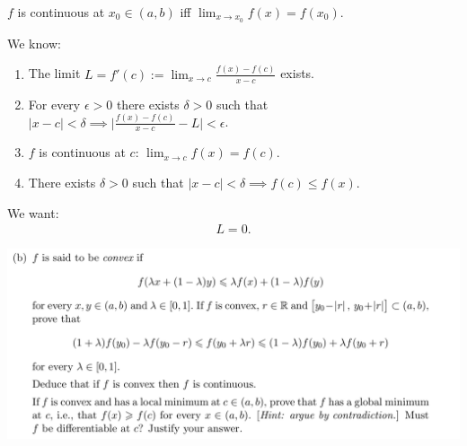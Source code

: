\documentclass[12pt]{article}
\begin{document}
$f$ is continuous at $x_0 \in (a, b)$ iff $\lim_{x\to x_0} f(x) = f(x_0)$.

We know:

\begin{enumerate}
\item The limit $L = f'(c) := \lim_{x\to c} \frac{f(x) - f(c)}{x - c}$ exists.
\item For every $\epsilon > 0$ there exists $\delta > 0$ such that
  $|x - c| < \delta \implies \Big|\frac{f(x) - f(c)}{x - c} - L\Big| < \epsilon$.
\item $f$ is continuous at $c$: $\lim_{x\to c}f(x) = f(c)$.
\item There exists $\delta > 0$ such that $|x - c| < \delta \implies f(c) \leq f(x)$.
\end{enumerate}

We want:
\begin{align*}
  L = 0.
\end{align*}


\newpage

\begin{mdframed}
\includegraphics[width=400pt]{img/misc--cambridge-1a-10D-b.png}
\end{mdframed}
\end{document}
